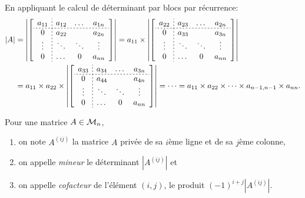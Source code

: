 \proof
En appliquant le calcul de déterminant par blocs par récurrence:
\begin{align*}
  |A| 
  & = 
  \left|\left[\begin{array}{c;{2pt/2pt}ccc}
                a_{11} & a_{12} & \dots & a_{1n} \\
                \hdashline[2pt/2pt]
                0 & a_{22} &  & a_{2n} \\
                \vdots  & \ddots & \ddots & \vdots \\
                0 & \dots & 0 & a_{nn} \\
              \end{array}\right]\right| 
  = a_{11} \times 
  \left|\left[\begin{array}{c;{2pt/2pt}ccc}
                a_{22} & a_{23} & \dots & a_{2n} \\
                \hdashline[2pt/2pt]
                0 & a_{33} &  & a_{3n} \\
                \vdots & \ddots & \ddots & \vdots \\
                0 & \dots & 0 & a_{nn} \\
              \end{array}\right]\right| \\
  & = a_{11} \times a_{22} \times 
  \left|\left[\begin{array}{c;{2pt/2pt}ccc}
                a_{33} & a_{34} & \dots & a_{3n} \\
                \hdashline[2pt/2pt]
                0 & a_{44} &  & a_{4n} \\
                \vdots  & \ddots & \ddots & \vdots \\
                0 & \dots & 0 & a_{nn} \\
              \end{array}\right]\right| 
  = \dots = a_{11} \times a_{22} \times \dots \times a_{n-1, n-1} \times a_{nn}.
\end{align*}
\eproof

\begin{definition*}
  Pour une matrice $A \in \mathcal{M}_n$, 
  \begin{enumerate}[\itemdot]
   \item on note $A^{(ij)}$ la matrice $A$ privée de sa $i$ème ligne et de sa $j$ème colonne,
   \item on appelle {\em mineur} le déterminant $|A^{(ij)}|$ et
   \item on appelle {\em cofacteur} de l'élément $(i, j)$, le produit $(-1)^{i+j} |A^{(ij)}|$.
  \end{enumerate}
\end{definition*}

